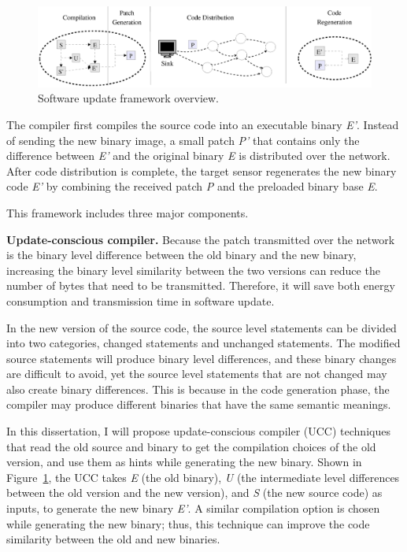 \begin{figure}[htbp]
	\centering
		\includegraphics[scale=0.4]{figures/model.eps}
	\caption{Software update framework overview.}
	\vspace{-0.2in}
	\label{fig:overview}
\end{figure}


The compiler first compiles the source code into an executable binary {\it E'}. 
Instead of sending the new binary image, a small patch {\it P'} that contains only the difference between {\it E'} and 
the original binary {\it E} is distributed over the network.  After code distribution is complete, the target sensor 
regenerates the new binary code {\it E'} by combining the received patch {\it P} and the preloaded binary base {\it E}. 

This framework includes three major components.

\textbf{Update-conscious compiler.} 
Because the patch transmitted over the network is the binary level difference between the old binary and the new  
binary, increasing the binary level similarity between the two versions can reduce the number of bytes that need to be 
transmitted. Therefore, it will save both energy consumption and transmission time in software update. 


In the new version of the source code, the source level statements can be divided into two categories, changed 
statements and unchanged statements.  The modified source statements will produce binary level differences, and these 
binary changes are difficult to avoid, yet the source level statements that are not changed may also create binary 
differences.
This is because in the code generation phase, the compiler may produce different binaries that have the same semantic 
meanings.

In this dissertation, I will propose update-conscious compiler (UCC) techniques that read the old source and binary to 
get the compilation choices of the old version, and use them as hints while generating the new binary. 
Shown in Figure~\ref{fig:overview}, the UCC takes {\it E} (the old binary), {\it U} (the intermediate level differences 
between the old version and the new version), and {\it S} (the new source code) as inputs, to generate the new binary 
{\it E'}. A similar compilation option is chosen while generating the new binary; thus, this technique can improve the 
code similarity between the old and new binaries.

